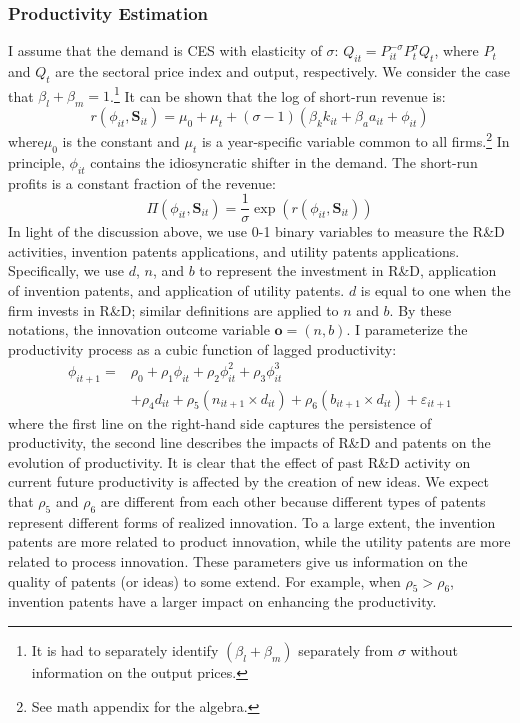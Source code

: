 \documentclass[English]{article}
\begin{document}
\subsubsection{Productivity Estimation}
I assume that the demand is CES with elasticity of $\sigma$: $Q_{it}=P_{it}^{-\sigma}P_t^{\sigma}Q_t$, where $P_t$ and $Q_t$ are the sectoral price index and output, respectively. We consider the case that $\beta_l+\beta_m=1$.\footnote{It is had to separately identify $(\beta_l+\beta_m)$ separately from $\sigma$ without information on the output prices.} It can be shown that the log of short-run revenue is:
\begin{equation}\label{log-rev}
    r(\phi_{it}, \mathbf{S}_{it}) =\mu_{0}+\mu_{t}+(\sigma-1)(\beta_kk_{it}+\beta_a a_{it}+\phi_{it})
\end{equation}
where$\mu_0$ is the constant and $\mu_t$ is a year-specific variable common to all firms.\footnote{See math appendix for the algebra.} In principle, $\phi_{it}$ contains the idiosyncratic shifter in the demand. The short-run profits is a constant fraction of the revenue:
\begin{equation}
    \Pi(\phi_{it},\mathbf{S}_{it})=\frac{1}{\sigma}\exp(r(\phi_{it},\mathbf{S}_{it}))
\end{equation}
In light of the discussion above, we use 0-1 binary variables to measure the R\&D activities, invention patents applications, and utility patents applications. Specifically, we use $d$, $n$, and $b$ to represent the investment in R\&D, application of invention
patents, and application of utility patents. $d$ is equal to one
when the firm invests in R\&D; similar definitions are applied to
$n$ and $b$. By these notations, the innovation outcome variable $\mathbf{o}=(n,b)$. I parameterize the productivity process as a cubic function of lagged productivity:
\begin{align} \label{mk}
\phi_{it+1} =& \rho_{0}+\rho_{1}\phi_{it}+\rho_{2}\phi_{it}^{2}+\rho_{3}\phi_{it}^{3} \\
             & +\rho_{4}d_{it}+\rho_{5}\left(n_{it+1}\times d_{it} \right)+\rho_{6}\left(b_{it+1}\times d_{it}\right)+\varepsilon_{it+1} \nonumber 
\end{align}
where the first line on the right-hand side captures the persistence
of productivity, the second line describes the impacts of R\&D and
patents on the evolution of productivity. It is clear that the effect
of past R\&D activity on current future productivity is affected by
the creation of new ideas. We expect
that $\rho_{5}$ and $\rho_{6}$ are different from each other because
different types of patents represent different forms of realized innovation. To a large extent, the invention patents are more related to product innovation, while
the utility patents are more related to process innovation. These
parameters give us information on the quality of patents (or ideas) to some extend.
For example, when $\rho_{5}>\rho_{6}$, invention patents have a larger impact on enhancing the productivity.
\end{document}
